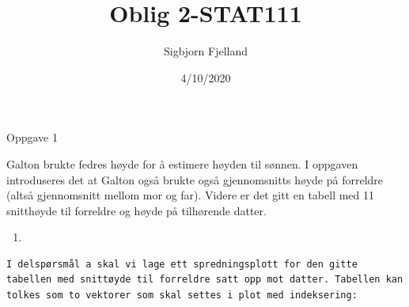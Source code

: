 \documentclass[]{article}
\title{Oblig 2-STAT111}
\author{Sigbjorn Fjelland}
\date{4/10/2020}
\begin{document}
\maketitle

Oppgave 1

Galton brukte fedres høyde for å estimere høyden til sønnen. I oppgaven
introduseres det at Galton også brukte også gjennomsnitts høyde på
forreldre (altså gjennomsnitt mellom mor og far). Videre er det gitt en
tabell med 11 snitthøyde til forreldre og høyde på tilhørende datter.

\begin{enumerate}
\def\labelenumi{\alph{enumi})}
\item
\end{enumerate}

\begin{verbatim}
I delspørsmål a skal vi lage ett spredningsplott for den gitte tabellen med snittøyde til forreldre satt opp mot datter. Tabellen kan tolkes som to vektorer som skal settes i plot med indeksering:
\end{verbatim}
\end{document}

